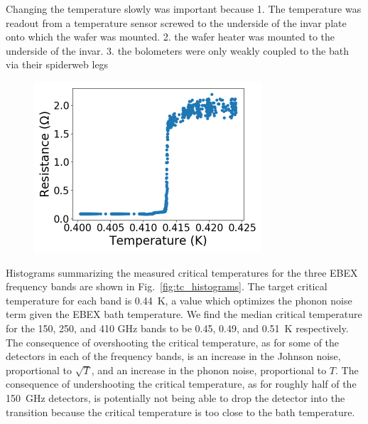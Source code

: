 Changing the temperature slowly was important because
1. The temperature was readout from a temperature sensor screwed to the underside of the invar plate onto which the wafer was mounted. 
2. the wafer heater was mounted to the underside of the invar. 
3. the bolometers were only weakly coupled to the bath via their spiderweb legs 




\begin{figure}[htbp]
\begin{center}
\includegraphics[height=2.5in]{figures/b53w0c0_rvst.png}
\caption{
\label{fig:tc_measurement} }
\end{center}
\end{figure} 

Histograms summarizing the measured critical temperatures for the three \ac{EBEX} frequency bands are shown in Fig.~\ref{fig:tc_histograms}. 
The target critical temperature for each band is 0.44~K, a value which optimizes the phonon noise term given the \ac{EBEX} bath temperature. %
We find the median critical temperature for the 150, 250, and 410 GHz bands to be 0.45, 0.49, and 0.51~K respectively.  
The consequence of overshooting the critical temperature, as for some of the detectors in each of the frequency bands, is an increase in the Johnson noise, proportional to $\sqrt{T}$, and an increase in the phonon noise, proportional to $T$. 
The consequence of undershooting the critical temperature, as for roughly half of the 150~GHz detectors, is potentially not being able to drop the detector into the transition because the critical temperature is too close to the bath temperature. %

